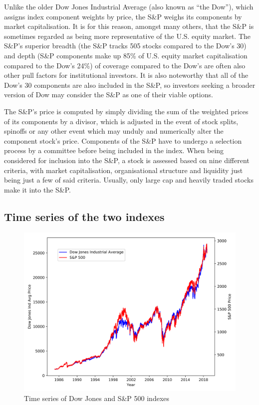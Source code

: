 \documentclass[a4paper]{article}
\begin{document}
	Unlike the older Dow Jones Industrial Average (also known as “the Dow”), which assigns index component weights by price, the S\&P weighs its components by market capitalisation. It is for this reason, amongst many others, that the S\&P is sometimes regarded as being more representative of the U.S. equity market. The S\&P’s superior breadth (the S\&P tracks 505 stocks compared to the Dow’s 30) and depth (S\&P components make up 85\% of U.S. equity market capitalisation compared to the Dow’s 24\%) of coverage compared to the Dow’s are often also other pull factors for institutional investors. It is also noteworthy that all of the Dow’s 30 components are also included in the S\&P, so investors seeking a broader version of Dow may consider the S\&P as one of their viable options.
	
	The S\&P’s price is computed by simply dividing the sum of the weighted prices of its components by a divisor, which is adjusted in the event of stock splits, spinoffs or any other event which may unduly and numerically alter the component stock’s price. Components of the S\&P have to undergo a selection process by a committee before being included in the index.  When being considered for inclusion into the S\&P, a stock is assessed based on nine different criteria, with market capitalisation, organisational structure and liquidity just being just a few of said criteria. Usually, only large cap and heavily traded stocks make it into the S\&P.
	
	\subsection{Time series of the two indexes}
	
	\begin{figure}[h]
		\centering
		\includegraphics[width=0.8\linewidth]{time_series.png}
		\caption{Time series of Dow Jones and S\&P 500 indexes}
	\end{figure}
	
\end{document}
